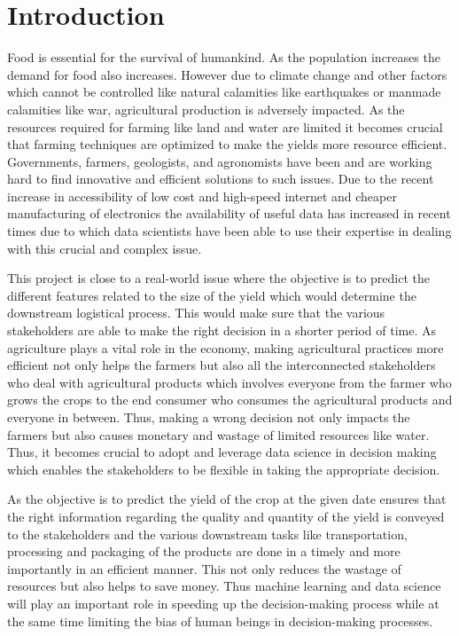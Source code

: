 \documentclass{article}
\begin{document}
\section{Introduction}
Food is essential for the survival of humankind. As the population increases the demand for food also increases. However due to climate change and other factors which cannot be controlled like natural calamities like earthquakes or manmade calamities like war, agricultural production is adversely impacted. As the resources required for farming like land and water are limited it becomes crucial that farming techniques are optimized to make the yields more resource efficient. Governments, farmers, geologists, and agronomists have been and are working hard to find innovative and efficient solutions to such issues. Due to the recent increase in accessibility of low cost and high-speed internet and cheaper manufacturing of electronics the availability of useful data has increased in recent times due to which data scientists have been able to use their expertise in dealing with this crucial and complex issue. 

This project is close to a real-world issue where the objective is to predict the different features related to the size of the yield which would determine the downstream logistical process. This would make sure that the various stakeholders are able to make the right decision in a shorter period of time. As agriculture plays a vital role in the economy, making agricultural practices more efficient not only helps the farmers but also all the interconnected stakeholders who deal with agricultural products which involves everyone from the farmer who grows the crops to the end consumer who consumes the agricultural products and everyone in between. Thus, making a wrong decision not only impacts the farmers but also causes monetary and wastage of limited resources like water. Thus, it becomes crucial to adopt and leverage data science in decision making which enables the stakeholders to be flexible in taking the appropriate decision\cite{meinke2009adaptation}. 

As the objective is to predict the yield of the crop at the given date ensures that the right information  regarding the quality and quantity of the yield is conveyed to the stakeholders and the various downstream tasks like transportation, processing and packaging of the products are done in a timely and more importantly in an efficient manner. This not only reduces the wastage of resources but also helps to save money. Thus machine learning and data science will play an important role in speeding up the decision-making process while at the same time limiting the bias of human beings in decision-making processes\cite{mcqueen1995applying}. 
\end{document}
